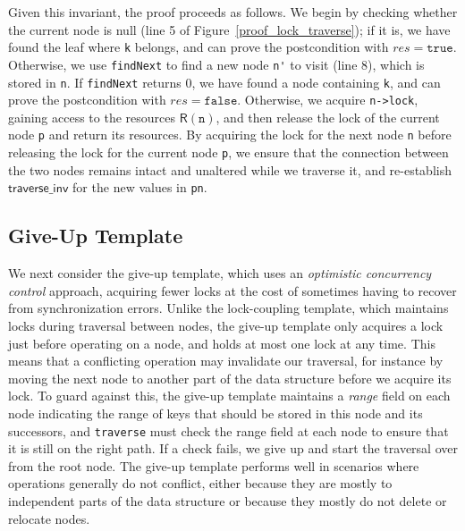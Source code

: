 \documentclass[a4paper,UKenglish,cleveref, autoref, thm-restate]{lipics-v2021}
\newcommand{\wm}[1]{\textbf{\textcolor{violet}{[William: #1]}}}
\begin{document}
Given this invariant, the proof proceeds as follows. %
We begin by checking whether the current node is null (line 5 of Figure~\ref{proof_lock_traverse}); if it is, we have found the leaf where \lstinline{k} belongs, and can prove the postcondition with $\mathit{res} = \texttt{true}$. Otherwise, we use \lstinline{findNext} to find a new node \lstinline{n'} to visit (line 8), which is stored in \lstinline{n}. If \lstinline{findNext} returns 0, we have found a node containing \lstinline{k}, and can prove the postcondition with $\mathit{res} = \mathtt{false}$. Otherwise, we acquire \lstinline{n->lock}, gaining access to the resources $\mathsf{R}(\texttt{n})$, and then release the lock of the current node \texttt{p} and return its resources. %
By acquiring the lock for the next node \texttt{n} before releasing the lock for the current node \texttt{p}, we ensure that the connection between the two nodes remains intact and unaltered while we traverse it, and re-establish $\mathsf{traverse\_inv}$ for the new values in \lstinline{pn}. 


\subsection{Give-Up Template}
\label{give-up-algo}

We next consider the give-up template, which uses an \emph{optimistic concurrency control} approach, acquiring fewer locks at the cost of sometimes having to recover from synchronization errors. Unlike the lock-coupling template, which maintains locks during traversal between nodes, the give-up template only acquires a lock just before operating on a node, and holds at most one lock at any time. This means that a conflicting operation may invalidate our traversal, for instance by moving the next node to another part of the data structure before we acquire its lock. To guard against this, the give-up template maintains a \emph{range} field on each node indicating the range of keys that should be stored in this node and its successors, and \lstinline{traverse} must check the range field at each node to ensure that it is still on the right path. If a check fails, we give up and start the traversal over from the root node. The give-up template performs well in scenarios where operations generally do not conflict, either because they are mostly to independent parts of the data structure or because they mostly do not delete or relocate nodes.
\end{document}
